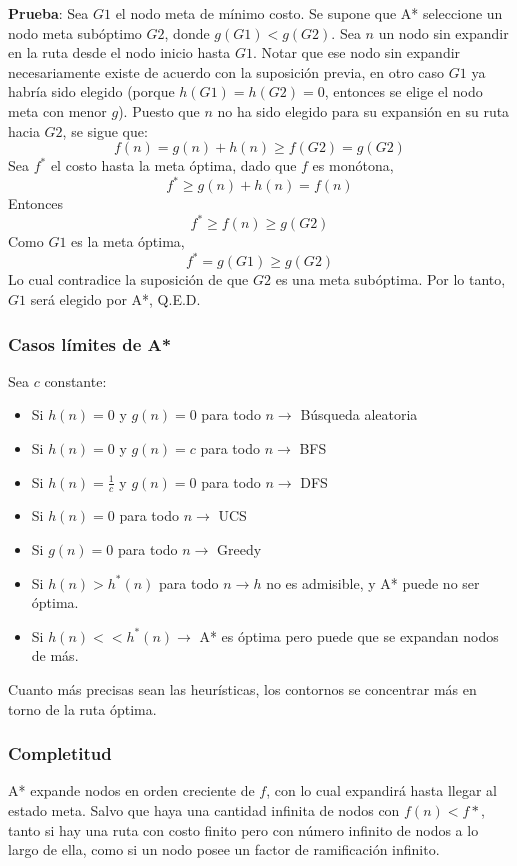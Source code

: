 \documentclass[a4paper,10pt]{paper}
\begin{document}
\textbf{Prueba}: Sea $G1$ el nodo meta de mínimo costo. Se supone que A*
seleccione un nodo meta subóptimo $G2$, donde $g(G1) < g(G2)$. Sea $n$ un nodo
sin expandir en la ruta desde el nodo inicio hasta $G1$. Notar que ese nodo sin
expandir necesariamente existe de acuerdo con la suposición previa, en otro
caso $G1$ ya habría sido elegido (porque $h(G1) = h(G2) = 0$, entonces se elige
el nodo meta con menor $g$). Puesto que $n$ no ha sido elegido para su expansión
en su ruta hacia $G2$, se sigue que:
$$ f(n) = g(n) + h(n) \geq f(G2) = g(G2) $$
Sea $f^*$ el costo hasta la meta óptima, dado que $f$ es monótona,
$$ f^* \geq g(n) + h(n) = f(n) $$
Entonces
$$ f^* \geq f(n) \geq g(G2) $$
Como $G1$ es la meta óptima,
$$ f^* = g(G1) \geq g(G2) $$
Lo cual contradice la suposición de que $G2$ es una meta subóptima. Por lo tanto,
$G1$ será elegido por A*, Q.E.D.

\subsubsection{Casos límites de A*}
Sea $c$ constante:
\begin{itemize}
\item Si $h(n) = 0$ y $g(n) = 0$ para todo $n \longrightarrow $ Búsqueda aleatoria
\item Si $h(n) = 0$ y $g(n) = c$ para todo $n \longrightarrow $ BFS
\item Si $h(n) = \frac{1}{c}$ y $g(n) = 0$ para todo $n \longrightarrow $ DFS
\item Si $h(n) = 0$ para todo $n \longrightarrow $ UCS
\item Si $g(n) = 0$ para todo $n \longrightarrow $ Greedy
\item Si $h(n) > h^*(n)$ para todo $n \longrightarrow h$ no es admisible, y A*
    puede no ser óptima.
\item Si $h(n) << h^*(n) \longrightarrow $ A* es óptima pero puede que se expandan
    nodos de más.
\end{itemize}

Cuanto más precisas sean las heurísticas, los contornos se concentrar más en torno
de la ruta óptima.

\subsubsection{Completitud}
A* expande nodos en orden creciente de $f$, con lo cual expandirá hasta llegar al
estado meta. Salvo que haya una cantidad infinita de nodos con $f(n) < f*$, tanto
si hay una ruta con costo finito pero con número infinito de nodos a lo largo de
ella, como si un nodo posee un factor de ramificación infinito.
\end{document}
